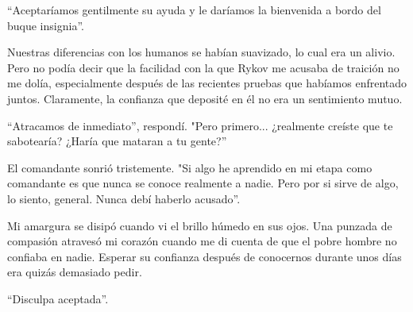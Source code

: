 ``Aceptaríamos gentilmente su ayuda y le daríamos la bienvenida a bordo del buque insignia''.

Nuestras diferencias con los humanos se habían suavizado, lo cual era un alivio. Pero no podía decir que la facilidad con la que Rykov me acusaba de traición no me dolía, especialmente después de las recientes pruebas que habíamos enfrentado juntos. Claramente, la confianza que deposité en él no era un sentimiento mutuo.

``Atracamos de inmediato'', respondí. "Pero primero... ¿realmente creíste que te sabotearía? ¿Haría que mataran a tu gente?''

El comandante sonrió tristemente. "Si algo he aprendido en mi etapa como comandante es que nunca se conoce realmente a nadie. Pero por si sirve de algo, lo siento, general. Nunca debí haberlo acusado''.

Mi amargura se disipó cuando vi el brillo húmedo en sus ojos. Una punzada de compasión atravesó mi corazón cuando me di cuenta de que el pobre hombre no confiaba en nadie. Esperar su confianza después de conocernos durante unos días era quizás demasiado pedir.

``Disculpa aceptada''.